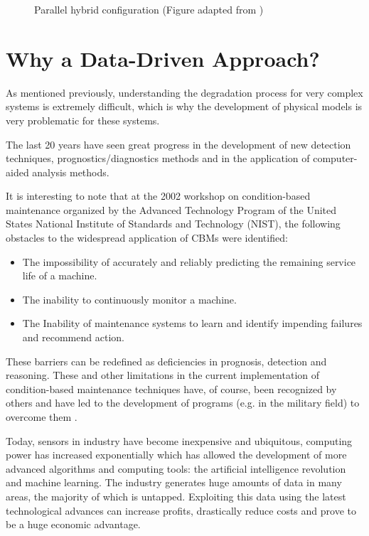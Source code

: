 \begin{figure}[H]
    \centering
    
    \caption{Parallel hybrid configuration (Figure adapted from \cite{Mangili2013})}
    \label{fig:hybrid-approach-parallel}
\end{figure}


\section{Why a Data-Driven Approach?}
As mentioned previously, understanding the degradation process for very complex systems is extremely difficult, which is why the development of physical models is very problematic for these systems.

The last 20 years have seen great progress in the development of new detection techniques, prognostics/diagnostics methods and in the application of computer-aided analysis methods. 

It is interesting to note that at the 2002 workshop on condition-based maintenance organized by the Advanced Technology Program of the United States National Institute of Standards and Technology (NIST), the following obstacles to the widespread application of CBMs were identified:
\begin{itemize}%
    \item The impossibility of accurately and reliably predicting the remaining service life of a machine.
    \item The inability to continuously monitor a machine.
    \item The Inability of maintenance systems to learn and identify impending failures and recommend action.
\end{itemize} 

These barriers can be redefined as deficiencies in prognosis, detection and reasoning. These and other limitations in the current implementation of condition-based maintenance techniques have, of course, been recognized by others and have led to the development of programs (e.g. in the military field) to overcome them \cite{Hess2008}.

Today, sensors in industry have become inexpensive and ubiquitous, computing power has increased exponentially which has allowed the development of more advanced algorithms and computing tools: the artificial intelligence revolution and machine learning. The industry generates huge amounts of data in many areas, the majority of which is untapped. Exploiting this data using the latest technological advances can increase profits, drastically reduce costs and prove to be a huge economic advantage.

